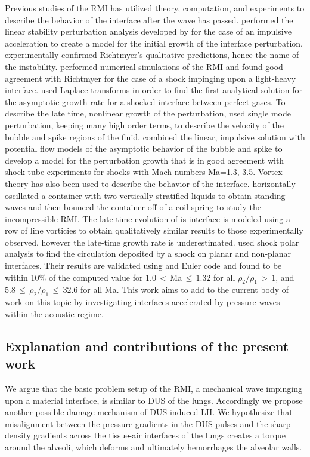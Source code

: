 Previous studies of the \ac{RMI} has utilized theory, computation, and
experiments to describe the behavior of the interface after the wave
has passed. \cite{Richtmyer1960} performed the linear stability
perturbation analysis developed by \cite{Taylor1950} for the case of
an impulsive acceleration to create a model for the initial growth of
the interface perturbation. \cite{Meshkov1969} experimentally
confirmed Richtmyer's qualitative predictions, hence the name of the
instability. \cite{Meyer1972} performed numerical simulations of the
\ac{RMI} and found good agreement with Richtmyer for the case of a
shock impinging upon a light-heavy interface. \cite{Frayey1986} used
Laplace transforms in order to find the first analytical solution for
the asymptotic growth rate for a shocked interface between perfect
gases. To describe the late time, nonlinear growth of the
perturbation, \cite{Zhang1997} used single mode perturbation, keeping
many high order terms, to describe the velocity of the bubble and
spike regions of the fluid. \cite{Sadot1998} combined the linear,
impulsive solution with potential flow models of the asymptotic
behavior of the bubble and spike to develop a model for the
perturbation growth that is in good agreement with shock tube
experiments for shocks with Mach numbers Ma=1.3, 3.5. Vortex theory
has also been used to describe the behavior of the
interface. \cite{Jacobs1996} horizontally oscillated a container with
two vertically stratified liquids to obtain standing waves and then
bounced the container off of a coil spring to study the incompressible
\ac{RMI}. The late time evolution of is interface is modeled using a
row of line vorticies to obtain qualitatively similar results to those
experimentally observed, however the late-time growth rate is
underestimated. \cite{Samtaney1994} used shock polar analysis to find
the circulation deposited by a shock on planar and non-planar
interfaces. Their results are validated using and Euler code and found
to be within 10\% of the computed value for $1.0\,<\,$Ma$\,\leq\,1.32$
for all $\rho_2/\rho_1\,>\,1$, and
$5.8\,\leq\,\rho_2/\rho_1\,\leq\,32.6$ for all Ma. This work aims to
add to the current body of work on this topic by investigating
interfaces accelerated by pressure waves within the acoustic regime.

\subsection{Explanation and contributions of the present work}
\label{subsec:usbe_lung_contribution_intro}
We argue that the basic problem setup of the \ac{RMI}, a mechanical
wave impinging upon a material interface, is similar to \ac{DUS} of
the lungs. Accordingly we propose another possible damage mechanism of
\ac{DUS}-induced \ac{LH}. We hypothesize that misalignment between the
pressure gradients in the \ac{DUS} pulses and the sharp density gradients
across the    tissue-air interfaces of the lungs creates a torque around
the alveoli, which deforms and ultimately hemorrhages the alveolar
walls.


